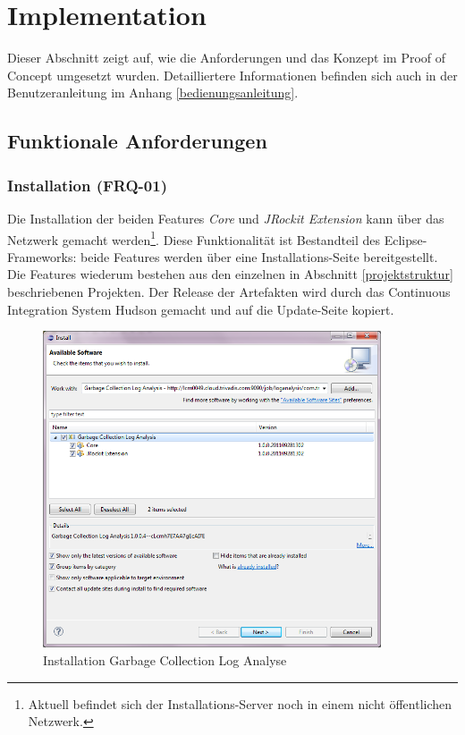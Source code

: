 \chapter{Implementation}\label{implementation}
Dieser Abschnitt zeigt auf, wie die Anforderungen und das Konzept im Proof of Concept umgesetzt wurden. Detailliertere Informationen befinden sich auch in der Benutzeranleitung im Anhang \ref{bedienungsanleitung}.
\section{Funktionale Anforderungen}
\subsection{Installation (FRQ-01)}
Die Installation der beiden Features \textit{Core} und \textit{JRockit Extension} kann über das Netzwerk gemacht werden\footnote{Aktuell befindet sich der Installations-Server noch in einem nicht öffentlichen Netzwerk.}. Diese Funktionalität ist Bestandteil des Eclipse-Frameworks: beide Features werden über eine Installations-Seite bereitgestellt. Die Features wiederum bestehen aus den einzelnen in Abschnitt \ref{projektstruktur} beschriebenen Projekten. Der Release der Artefakten wird durch das Continuous Integration System Hudson gemacht und auf die Update-Seite kopiert.
 \begin{figure}[H]
  	\centering
    	\includegraphics[width=10cm]{images/tutorial_install01}
        	\caption{Installation Garbage Collection Log Analyse}
\end{figure}

